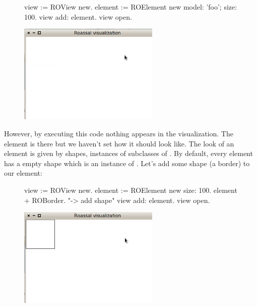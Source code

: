 \documentclass[a4paper,10pt,twoside]{book}
\begin{document}
\begin{figure}[H]
      \begin{minipage}[t]{0.5\textwidth}
      \vspace{0pt}
\begin{code}{}
view := ROView new.
element := ROElement new 
				model: 'foo'; 
				size: 100.
view add: element.
view open.
\end{code}
   \end{minipage}
   \hfill
   \begin{minipage}[t]{0.6\textwidth}
      \vspace{0pt} \raggedright
       \centering
		\includegraphics[width=0.6\textwidth]{ex1}
   \end{minipage}
\label{fig:ex1}
\end{figure}

However, by executing this code nothing appears in the visualization. The element is there but we haven't set how it should look like. The look of an element is given by shapes, instances of subclasses of . By default, every element has a empty shape which is an instance of . Let's add some shape (a border) to our element: 

\begin{figure}[H]
      \begin{minipage}[t]{0.5\textwidth}
      \vspace{0pt}
\begin{code}{}
view := ROView new.
element := ROElement new size: 100.
element 
	+ ROBorder. "-> add shape"
view add: element.
view open.
\end{code}
   \end{minipage}
   \hfill
   \begin{minipage}[t]{0.6\textwidth}
      \vspace{0pt} \raggedright
       \centering
		\includegraphics[width=0.6\textwidth]{ex2}
   \end{minipage}
\label{fig:ex2}
\end{figure}
\end{document}
